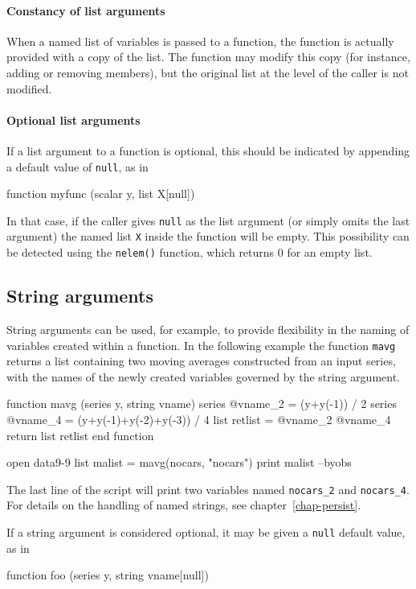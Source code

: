 \paragraph{Constancy of list arguments} When a named list of
variables is passed to a function, the function is actually provided
with a copy of the list.  The function may modify this copy (for
instance, adding or removing members), but the original list at the
level of the caller is not modified.

\paragraph{Optional list arguments} If a list argument to a function is
optional, this should be indicated by appending a default value of
\texttt{null}, as in
%
\begin{code}
function myfunc (scalar y, list X[null])
\end{code}
%
In that case, if the caller gives \texttt{null} as the list argument
(or simply omits the last argument) the named list \texttt{X} inside the
function will be empty.  This possibility can be detected using the
\texttt{nelem()} function, which returns 0 for an empty list.

\subsection{String arguments}

String arguments can be used, for example, to provide flexibility in
the naming of variables created within a function.  In the following
example the function \texttt{mavg} returns a list containing two
moving averages constructed from an input series, with the names of
the newly created variables governed by the string argument.
%
\begin{code}
function mavg (series y, string vname)
   series @vname_2 = (y+y(-1)) / 2
   series @vname_4 = (y+y(-1)+y(-2)+y(-3)) / 4
   list retlist = @vname_2 @vname_4
   return list retlist
end function

open data9-9
list malist = mavg(nocars, "nocars")
print malist --byobs
\end{code}
%
The last line of the script will print two variables named
\verb|nocars_2| and \verb|nocars_4|.  For details on the handling of
named strings, see chapter~\ref{chap-persist}.

If a string argument is considered optional, it may be given a
\texttt{null} default value, as in
%
\begin{code}
function foo (series y, string vname[null])
\end{code}

